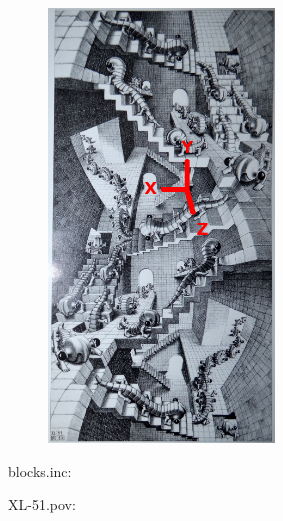 \documentclass[12pt, a4paper]{article}
\begin{document}
\begin{center}
\begin{figure}[H]
\centering
\includegraphics[width=6cm]{./originCorner.png}\\
\end{figure}
\end{center}

blocks.inc:\\
\begin{scriptsize}
\begin{ttfamily}

\end{ttfamily}
\end{scriptsize}

XL-51.pov:\\
\begin{scriptsize}
\begin{ttfamily}

\end{ttfamily}
\end{scriptsize}
\end{document}
